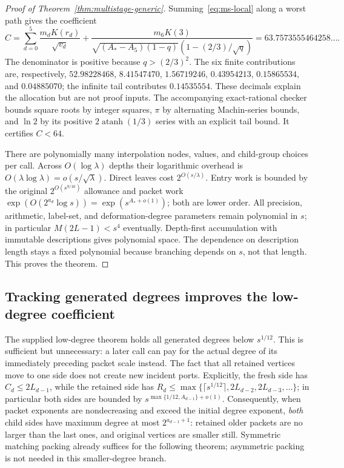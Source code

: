 \begin{proof}[Proof of Theorem~\ref{thm:multistage-generic}]
Summing~\eqref{eq:ms-local} along a worst path gives the coefficient
\begin{equation}\label{eq:ms-constant}
 C=\sum_{d=0}^{5}\frac{m_dK(r_d)}{\sqrt{v_d}}
 +\frac{m_6K(3)}{\sqrt{(A_*-A_5)(1-q)}
                   (1-(2/3)/\sqrt q)}
 =63.7573555464258\ldots.
\end{equation}
The denominator is positive because $q>(2/3)^2$.
The six finite contributions are, respectively,
$52.98228468$, $8.41547470$, $1.56719246$, $0.43954213$,
$0.15865534$, and $0.04885070$; the infinite tail contributes
$0.14535554$. These decimals explain the allocation but are not proof inputs.
The accompanying exact-rational checker bounds square roots by integer
squares, $\pi$ by alternating Machin-series bounds, and $\ln2$ by its
positive $2\operatorname{atanh}(1/3)$ series with an explicit tail bound.
It certifies $C<64$.

There are polynomially many interpolation nodes, values, and child-group
choices per call. Across $O(\log\lambda)$ depths their logarithmic overhead
is $O(\lambda\log\lambda)=o(s/\sqrt\lambda)$. Direct leaves cost
$2^{O(s/\lambda)}$. Entry work is bounded by the original
$2^{O(s^{9/10})}$ allowance and packet work
$\exp(O(2^{a_d}\log s))=\exp(s^{A_*+o(1)})$; both are lower order.
All precision, arithmetic, label-set, and deformation-degree parameters
remain polynomial in $s$; in particular $M(2L-1)<s^4$ eventually.
Depth-first accumulation with immutable descriptions gives polynomial space.
The dependence on description length stays a fixed polynomial because
branching depends on $s$, not that length. This proves the theorem.
\end{proof}

\subsection{Tracking generated degrees improves the low-degree coefficient}
The supplied low-degree theorem holds all generated degrees below
$s^{1/12}$. This is sufficient but unnecessary: a later call can pay for the
actual degree of its immediately preceding packet scale instead. The fact
that all retained vertices move to one side does not create new incident
ports. Explicitly, the fresh side has $C_d\le 2L_{d-1}$, while the
retained side has
$R_d\le\max\{\lceil s^{1/12}\rceil,2L_{d-2},2L_{d-3},\ldots\}$;
in particular both sides are bounded by
$s^{\max\{1/12,A_{d-1}\}+o(1)}$.
Consequently, when packet exponents are nondecreasing and exceed
the initial degree exponent, \emph{both} child sides have maximum degree
at most $2^{a_{d-1}+1}$: retained older packets are no larger than the last
ones, and original vertices are smaller still. Symmetric matching packing
already suffices for the following theorem; asymmetric packing is not needed
in this smaller-degree branch.

